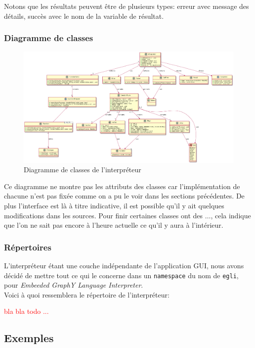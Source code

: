 \documentclass[french]{article}
\begin{document}
				Notons que les résultats peuvent être de plusieurs types: erreur avec message des détails, succès avec le nom de la variable de résultat.
			
			\subsubsection{Diagramme de classes}
			
				\begin{figure}[H]
					\centering
					\includegraphics[width=0.9\textheight,angle=90]{Conception/UMLEGLI}
					\caption{Diagramme de classes de l'interpréteur  \cite{plantuml}}
				\end{figure}
				
				Ce diagramme ne montre pas les attributs des classes car l'implémentation de chacune n'est pas fixée comme on a pu le voir dans les sections précédentes. De plus l'interface est là à titre indicative, il est possible qu'il y ait quelques modifications dans les sources. Pour finir certaines classes ont des $\dots$, cela indique que l'on ne sait pas encore à l'heure actuelle ce qu'il y aura à l'intérieur.
			
			\subsubsection{Répertoires}
				L'interpréteur étant une couche indépendante de l'application GUI, nous avons décidé de mettre tout ce qui le concerne dans un \texttt{namespace} du nom de \texttt{egli}, pour \textit{Embeeded GraphY Language Interpreter}.\\
				
				Voici à quoi ressemblera le répertoire de l'interpréteur:
				
				\textcolor{red}{bla bla todo ...}
			
		\subsection{Exemples}
		
\end{document}
